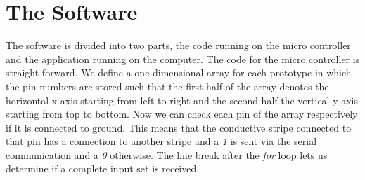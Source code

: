 \section{The Software}
The software is divided into two parts, the code running on the micro controller and the application running on the computer. The code for the micro controller is straight forward. We define a one dimensional array for each prototype in which the pin numbers are stored such that the first half of the array denotes the horizontal x-axis starting from left to right and the second half the vertical y-axis starting from top to bottom. Now we can check each pin of the array respectively if it is connected to ground. This means that the conductive stripe connected to that pin has a connection to another stripe and a \emph{1} is sent via the serial communication and a \emph{0} otherwise. The line break after the \emph{for} loop lets us determine if a complete input set is received.

